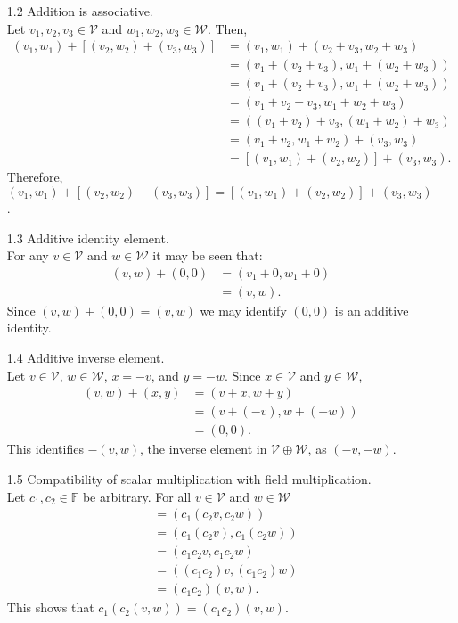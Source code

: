 \documentclass[12pt]{amsart}
\newcommand{\1}{\mathbbm{1}}
\numberwithin{equation}{section}
\numberwithin{Theorem}{section}
\theoremstyle{plain} %
\theoremstyle{definition}
\theoremstyle{remark}
\begin{document}
\begin{enumerate}[1.]
\begin{itemize}
	\item[1.2] Addition is associative. \\
	Let $v_1,v_2,v_3 \in \mathcal{V}$ and $w_1,w_2,w_3 \in \mathcal{W}$.
	Then,
	\begin{align*}
		(v_1,w_1)+[(v_2,w_2)+(v_3,w_3)] 
		&=   (v_1,w_1)+(v_2+v_3, w_2+w_3) \\
		&=   (v_1+ (v_2+v_3), w_1+ (w_2+w_3)) \\
		&=   (v_1+ (v_2+v_3),  w_1+ (w_2+w_3)) \\
		&=   (v_1+ v_2+v_3,  w_1+ w_2+w_3) \\
		&=   ((v_1+ v_2)+v_3,  (w_1+ w_2)+w_3) \\
		&=   (v_1+ v_2 , w_1+ w_2) + (v_3, w_3) \\
		&=   [(v_1,w_1)+(v_2,w_2)]+(v_3,w_3)  .
	\end{align*}
	Therefore, $(v_1,w_1)+[(v_2,w_2)+(v_3,w_3)]  =  [(v_1,w_1)+(v_2,w_2)]+(v_3,w_3)$. \\
	
	\item[1.3]  Additive identity element. \\
	For any $v \in \mathcal{V}$ and $w\in \mathcal{W}$ it may be seen that:
	\begin{align*}
				(v,w)+(0,0)
		&=   (v_1+0, w_1+0) \\
		&=   (v, w).
	\end{align*}
	Since $(v,w)+(0,0) = (v, w)$ we may identify $(0,0)$ is an additive identity. \\
	
	\item[1.4]  Additive inverse element. \\
	Let $v \in \mathcal{V}$, $w \in \mathcal{W}$, $x = -v$, and $y = -w$.
	Since $x\in \mathcal{V}$ and $y\in \mathcal{W}$,
	\begin{align*}
			(v,w)+(x,y)
		&= (v+x, w+y) \\
		&= (v+(-v), w+(-w)) \\
		&= (0,0).
	\end{align*}
	 This identifies $-(v,w)$, the inverse element in $\mathcal{V}\oplus\mathcal{W}$, as $(-v,-w)$.\\
	
	\item[1.5]  Compatibility of scalar multiplication with field multiplication. \\
	Let $c_1, c_2 \in\mathbb{F}$ be arbitrary.
	For all $v \in \mathcal{V}$ and $w \in \mathcal{W}$ 
	\begin{align*}
		[c_1(c_2(v,w))]
		&= (c_1(c_2v,c_2w)) \\
		&= (c_1(c_2v),c_1(c_2w)) \\
		&= (c_1c_2v,c_1c_2w) \\
		&= ((c_1c_2)v,(c_1c_2)w) \\
		&= (c_1c_2)(v,w).
	\end{align*}
	This shows that $c_1(c_2(v,w)) = (c_1c_2)(v,w)$. \\
	

\end{itemize}
\end{enumerate}
\end{document}
